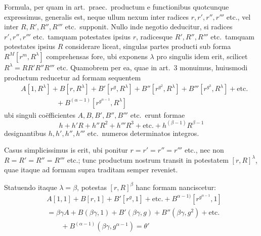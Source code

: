 Formula, per quam in art.\ praec.\ productum e functionibus quotcunque expressimus, generalis est, neque ullum nexum inter radices $r,r',r'',r'''$ etc., vel inter $R,R',R'',R'''$ etc.\ supponit. Nullo inde negotio deducitur, si radices $r',r'',r'''$ etc.\ tamquam potestates ipsius $r$, radicesque $R',R'',R'''$ etc.\ tamquam potestates ipsius $R$ considerare liceat, singulas partes producti sub forma $R^M[r^m,R^\lambda]$ comprehensas fore, ubi exponens $\lambda$ pro singulis idem erit, scilicet $R^\lambda=RR'R''R'''$ etc. Quamobrem per ea, quae in art.\ 3 monuimus, huiusmodi productum reducetur ad formam sequentem
\[
\begin{aligned}
&A[1,R^\lambda]+B[r,R^\lambda]+B'[r^g,R^\lambda]+B''[r^{g^2},R^\lambda]+B'''[r^{g^3},R^\lambda]+\text{etc.}\\
&\hspace{5em}{}+B^{(\alpha-1)}[r^{g^{\alpha-1}},R^\lambda]
\end{aligned}
\]
ubi singuli coëfficientes $A,B,B',B'',B'''$ etc.\ erunt formae
\[
h+h'R+h''R^2+h'''R^3+\text{etc.}+h^{(\beta-1)}R^{\beta-1}
\]
designantibus $h,h',h'',h'''$ etc.\ numeros determinatos integros.

Casus simplicissimus is erit, ubi ponitur $r=r'=r''=r'''$ etc., nec non $R=R'=R''=R'''$ etc.; tunc productum nostrum transit in potestatem $[r,R]^\lambda$, quae itaque ad formam supra traditam semper reveniet.

Statuendo itaque $\lambda=\beta$, potestas $[r,R]^\beta$ hanc formam nanciscetur:
\[
\begin{aligned}
&A[1,1]+B[r,1]+B'[r^g,1]+\text{etc.}+B^{\alpha-1)}[r^{g^{\alpha-1}},1]\\
&{}=\beta\gamma A+B(\beta\gamma,1)+B'(\beta\gamma,g)+B''(\beta\gamma,g^2)+\text{etc.}\\
&\qquad{}+B^{(\alpha-1)}(\beta\gamma,g^{\alpha-1})=\theta'
\end{aligned}
\]

